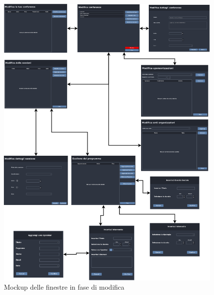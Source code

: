 
\begin{figure}
	\centering
	\includegraphics[scale=0.5]{Immagini/Mockup/Edit/Flow_Edit.png}
	\caption{Mockup delle finestre in fase di modifica}
\end{figure}

